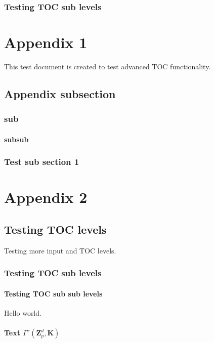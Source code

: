 \documentclass{book}
\begin{document}
\subsection{Testing TOC sub levels}

\appendix

\chapter{Appendix 1}
This test document is created to test advanced TOC functionality.

\section{Appendix subsection}

\subsection{sub}

\subsubsection{subsub}


\subsection{Test sub section 1}

\chapter{Appendix 2}

\section{Testing TOC levels}
Testing more input and TOC levels.

\subsection{Testing TOC sub levels}

\subsubsection{Testing TOC sub sub levels}
Hello world.

\subsubsection{Text $\Gamma^{r}(\ensuremath{{\mathbf{Z}}}_p^d,\mathbf{K})$}
\end{document}
